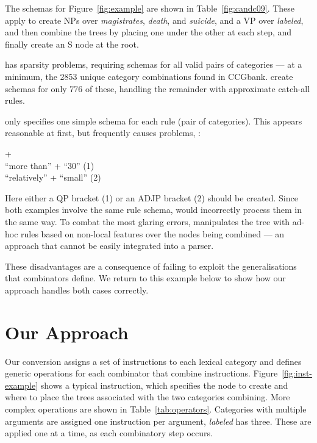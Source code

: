 The schemas for Figure~\ref{fig:example} are shown in Table~\ref{fig:candc09}.
These apply to create NPs over \textit{magistrates}, \textit{death}, and
\textit{suicide}, and a VP over \textit{labeled}, and then combine the trees by
placing one under the other at each step, and finally create an S node at the
root.

\old has sparsity problems, requiring schemas for all valid pairs of
categories --- at a minimum, the 2853 unique category combinations found in
CCGbank. \textcite{Clark-Curran:2009} create schemas for only 776 of these,
handling the remainder with approximate catch-all rules.

\old only specifies one simple schema for each rule (pair of
categories).  This appears reasonable at first, but frequently causes
problems, \myeg:

\vspace{2mm}
\parbox{0.97\linewidth}{\footnotesize
{} +  \\
``more than'' + ``30'' \hfill(1)\hspace*{2mm}\\ %
``relatively'' + ``small'' \hfill(2)\hspace*{2mm}\\ %
}

Here either a QP bracket (1) or an ADJP bracket (2) should be created.  Since
both examples involve the same rule schema, \old would incorrectly process them
in the same way.  To combat the most glaring errors, \old manipulates the \ptb
tree with ad-hoc rules based on non-local features over the \ccg nodes
being combined --- an approach that cannot be easily integrated into a
parser.

These disadvantages are a consequence of failing to exploit the generalisations
that \ccg combinators define.  We return to this example below to show how our
approach handles both cases correctly.

\section{Our Approach}

Our conversion assigns a set of instructions to each lexical category and
defines generic operations for each combinator that combine instructions.
Figure~\ref{fig:inst-example} shows a typical instruction, which specifies the
node to create and where to place the \ptb trees associated with the two
categories combining.  More complex operations are shown in
Table~\ref{tab:operators}.  Categories with multiple arguments are assigned one
instruction per argument, \myeg \textit{labeled} has three.  These are applied
one at a time, as each combinatory step occurs.

